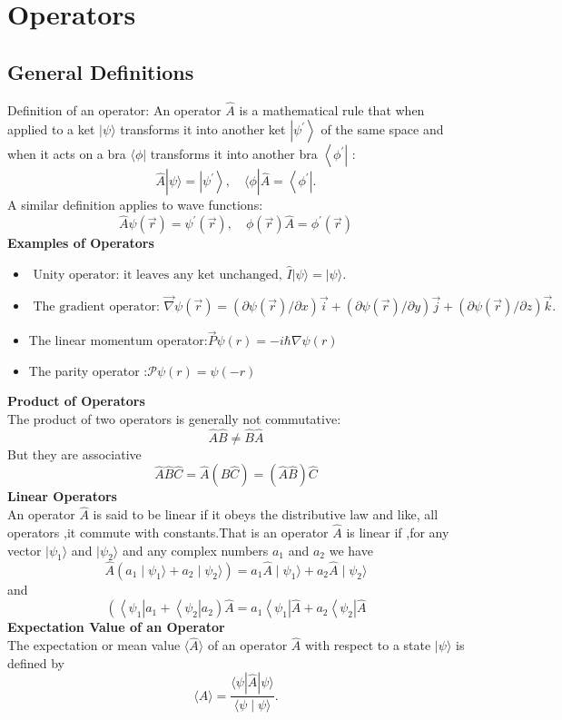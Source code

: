 \section{Operators}
\subsection{General Definitions}
 Definition of an operator: An operator $ \hat{A}$ is a mathematical rule that when applied to a ket $|\psi\rangle$ transforms it into another ket $\left|\psi^{\prime}\right\rangle$ of the same space and when it acts on a bra $\langle\phi|$ transforms it into another bra $\left\langle\phi^{\prime}\right|$ :
 $$
 \hat{A}|\psi\rangle=\left|\psi^{\prime}\right\rangle, \quad\langle\phi| \hat{A}=\left\langle\phi^{\prime}\right| .
 $$
 A similar definition applies to wave functions:
 $$
 \hat{A} \psi(\vec{r})=\psi^{\prime}(\vec{r}), \quad \phi(\vec{r}) \hat{A}=\phi^{\prime}(\vec{r})
 $$
 \textbf{Examples of Operators}
 \begin{itemize}
 	\item $\text { Unity operator: it leaves any ket unchanged, } \hat{I}|\psi\rangle=|\psi\rangle \text {. }$
 	\item $\text { The gradient operator: } \vec{\nabla} \psi(\vec{r})=(\partial \psi(\vec{r}) / \partial x) \vec{i}+(\partial \psi(\vec{r}) / \partial y) \vec{j}+(\partial \psi(\vec{r}) / \partial z) \vec{k} \text {. }$
 	\item The linear momentum operator:$\vec{P}\psi(r)=-i\hbar \nabla \psi(r)$ 
 	\item The parity operator :$\mathcal{P}\psi(r)=\psi(-r)$
 \end{itemize}
\textbf{Product of Operators}\\
The product of two operators is generally not commutative:\\
$$\hat{A}\hat{B}\neq \hat{B}\hat{A}$$
But they are associative\\
$$\hat{A}\hat{B}\hat{C}=\hat{A}(\hat{B}\hat{C})=(\hat{A}\hat{B})\hat{C}$$
\textbf{Linear Operators}\\
An operator $\hat{A}$ is said to be linear if it obeys the distributive law and like, all operators ,it commute with constants.That is an operator $\hat{A}$ is linear if ,for any vector $|\psi_{1}\rangle $ and $|\psi_{2}\rangle $ and any complex numbers $a_1$ and $a_2$ we have\\
$$\hat{A}(a_1\mid \psi_{1}\rangle +a_2\mid \psi_{2}\rangle)=a_1 \hat{A} \mid \psi_{1}\rangle +a_2\hat{A}\mid \psi_{2}\rangle $$
and
$$\left(\left\langle\psi_{1}\right| a_{1}+\left\langle\psi_{2}\right| a_{2}\right) \hat{A}=a_{1}\left\langle\psi_{1}\right| \hat{A}+a_{2}\left\langle\psi_{2}\right| \hat{A}$$
\textbf{Expectation Value of an Operator}\\
The expectation or mean value $\langle\hat{A}\rangle$ of an operator $\hat{A}$ with respect to a state $|\psi\rangle$ is defined by
$$
\langle\hat{A}\rangle=\frac{\langle\psi|\hat{A}| \psi\rangle}{\langle\psi \mid \psi\rangle} .
$$
